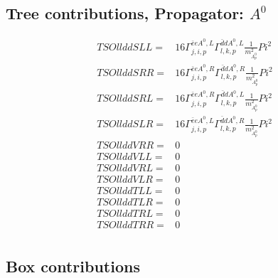 \documentclass[A4,landscape]{article}
\begin{document}
\subsection{Tree contributions, Propagator: $A^0$} 

\begin{align} 
  TSOllddSLL= & 16 \Gamma^{\bar{e}e A^0 ,L}_{j, i, p} \Gamma^{\bar{d}d A^0 ,L}_{l, k, p} \frac{1}{m^2_{A^0_{{p}}}} Pi^2 \\ 
  TSOllddSRR= & 16 \Gamma^{\bar{e}e A^0 ,R}_{j, i, p} \Gamma^{\bar{d}d A^0 ,R}_{l, k, p} \frac{1}{m^2_{A^0_{{p}}}} Pi^2 \\ 
  TSOllddSRL= & 16 \Gamma^{\bar{e}e A^0 ,R}_{j, i, p} \Gamma^{\bar{d}d A^0 ,L}_{l, k, p} \frac{1}{m^2_{A^0_{{p}}}} Pi^2 \\ 
  TSOllddSLR= & 16 \Gamma^{\bar{e}e A^0 ,L}_{j, i, p} \Gamma^{\bar{d}d A^0 ,R}_{l, k, p} \frac{1}{m^2_{A^0_{{p}}}} Pi^2 \\ 
  TSOllddVRR= & 0 \\ 
  TSOllddVLL= & 0 \\ 
  TSOllddVRL= & 0 \\ 
  TSOllddVLR= & 0 \\ 
  TSOllddTLL= & 0 \\ 
  TSOllddTLR= & 0 \\ 
  TSOllddTRL= & 0 \\ 
  TSOllddTRR= & 0 \\ 
\end{align} 
\subsection{Box contributions} 
\end{document}
